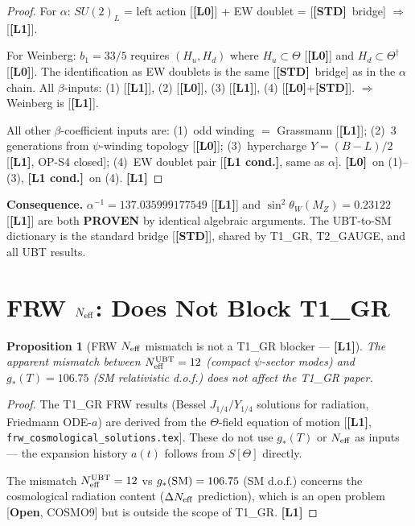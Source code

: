 \documentclass[12pt,a4paper]{article}
\newtheorem{proposition}[theorem]{Proposition}
\theoremstyle{remark}\newtheorem{remark}[theorem]{Remark}
\newcommand{\Lz}{\textbf{[L0]}}
\newcommand{\Lo}{\textbf{[L1]}}
\newcommand{\Lc}{\textbf{[L1 cond.]}}
\newcommand{\STD}{\textbf{[STD]}}
\begin{document}
\begin{proof}
For $\alpha$: $SU(2)_L$ = left action [\Lz] + EW doublet = [\STD\ bridge]
$\Rightarrow$ [\Lo].

For Weinberg: $b_1=33/5$ requires $(H_u,H_d)$ where $H_u\subset\Theta$
[\Lz] and $H_d\subset\Theta^\dagger$ [\Lz]. The identification as EW
doublets is the same [\STD\ bridge] as in the $\alpha$ chain.
All $\beta$-inputs: (1) [\Lo], (2) [\Lz], (3) [\Lo], (4) [\Lz+\STD].
$\Rightarrow$ Weinberg is [\Lo].

All other $\beta$-coefficient inputs are:
(1)~odd winding $=$ Grassmann [\Lo]; (2)~3 generations from
$\psi$-winding topology [\Lz]; (3)~hypercharge $Y=(B-L)/2$ [\Lo,
OP-S4 closed]; (4)~EW doublet pair [\Lc, same as $\alpha$].
\Lz\ on (1)--(3), \Lc\ on (4). \Lo
\end{proof}

\begin{resultbox}
\textbf{Consequence.}
$\alpha^{-1}=137.035999177549$ [\Lo] and $\sin^2\theta_W(M_Z)=0.23122$ [\Lo]
are both \textbf{PROVEN} by identical algebraic arguments.
The UBT-to-SM dictionary is the standard bridge [\STD], shared by
T1\_GR, T2\_GAUGE, and all UBT results.
\end{resultbox}

\section{FRW $N_{\rm eff}$: Does Not Block T1\_GR}
\label{sec:frw}

\begin{proposition}[FRW $N_{\rm eff}$ mismatch is not a T1\_GR blocker — \Lo]
\label{prop:frw}
The apparent mismatch between $N_{\rm eff}^{\rm UBT}=12$ (compact
$\psi$-sector modes) and $g_*(T)=106.75$ (SM relativistic d.o.f.)
does not affect the T1\_GR paper.
\end{proposition}

\begin{proof}\sloppy
The T1\_GR FRW results (Bessel $J_{1/4}/Y_{1/4}$ solutions for
radiation, Friedmann ODE-$a$) are derived from the $\Theta$-field
equation of motion [\Lo, \texttt{frw\_cosmological\_solutions.tex}].\linebreak
These do not use $g_*(T)$ or $N_{\rm eff}$ as inputs — the
expansion history $a(t)$ follows from $S[\Theta]$ directly.

The mismatch $N_{\rm eff}^{\rm UBT}=12$ vs $g_*({\rm SM})=106.75$ (SM d.o.f.)
concerns the cosmological radiation content ($\Delta N_{\rm eff}$
prediction), which is an open problem [\textbf{Open}, COSMO9]
but is outside the scope of T1\_GR. \Lo
\end{proof}
\end{document}
